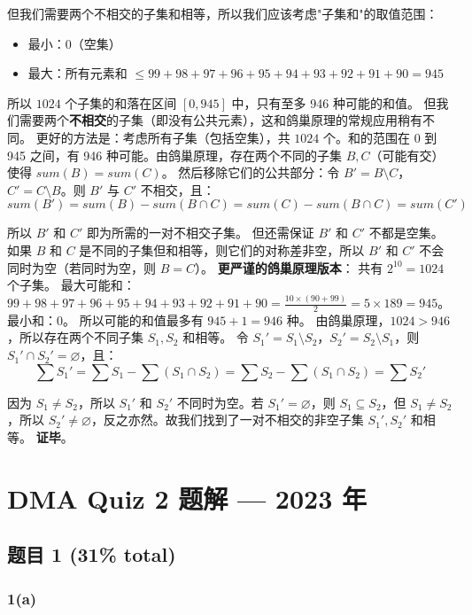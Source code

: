 \documentclass[10pt,a4paper,openany]{ctexbook}
\theoremstyle{definition}
\theoremstyle{remark}
\begin{document}
但我们需要两个不相交的子集和相等，所以我们应该考虑"子集和"的取值范围：
\begin{itemize}
\item 最小：0（空集）
\item 最大：所有元素和 $\leq 99+98+97+96+95+94+93+92+91+90 = 945$

\end{itemize}

所以 $1024$ 个子集的和落在区间 $[0, 945]$ 中，只有至多 946 种可能的和值。
但我们需要两个\textbf{不相交}的子集（即没有公共元素），这和鸽巢原理的常规应用稍有不同。
更好的方法是：考虑所有子集（包括空集），共 $1024$ 个。和的范围在 0 到 945 之间，有 946 种可能。由鸽巢原理，存在两个不同的子集 $B, C$（可能有交）使得 $sum(B) = sum(C)$。
然后移除它们的公共部分：令 $B' = B \setminus C$，$C' = C \setminus B$。则 $B'$ 与 $C'$ 不相交，且：
\[
sum(B') = sum(B) - sum(B \cap C) = sum(C) - sum(B \cap C) = sum(C')
\]

所以 $B'$ 和 $C'$ 即为所需的一对不相交子集。
但还需保证 $B'$ 和 $C'$ 不都是空集。如果 $B$ 和 $C$ 是不同的子集但和相等，则它们的对称差非空，所以 $B'$ 和 $C'$ 不会同时为空（若同时为空，则 $B = C$）。
\textbf{更严谨的鸽巢原理版本}：
共有 $2^{10} = 1024$ 个子集。
最大可能和：$99+98+97+96+95+94+93+92+91+90 = \frac{10 \times (90+99)}{2} = 5 \times 189 = 945$。
最小和：0。
所以可能的和值最多有 $945 + 1 = 946$ 种。
由鸽巢原理，$1024 > 946$，所以存在两个不同子集 $S_1, S_2$ 和相等。
令 $S_1' = S_1 \setminus S_2$，$S_2' = S_2 \setminus S_1$，则 $S_1' \cap S_2' = \varnothing$，且：
\[
\sum S_1' = \sum S_1 - \sum (S_1 \cap S_2) = \sum S_2 - \sum (S_1 \cap S_2) = \sum S_2'
\]

因为 $S_1 \neq S_2$，所以 $S_1'$ 和 $S_2'$ 不同时为空。若 $S_1' = \varnothing$，则 $S_1 \subseteq S_2$，但 $S_1 \neq S_2$，所以 $S_2' \neq \varnothing$，反之亦然。故我们找到了一对不相交的非空子集 $S_1', S_2'$ 和相等。
\textbf{证毕}。


\section{DMA Quiz 2 题解 — 2023 年}

\subsection{题目 1 (31\% total)}

\subsubsection{1(a)}
\end{document}
